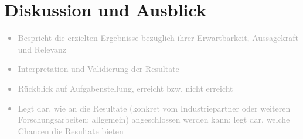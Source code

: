 \chapter{Diskussion und Ausblick}
\label{sec:DiskussionUndAusblick}

\textcolor{darkgray}{
  \begin{itemize}
  \item Bespricht die erzielten Ergebnisse bezüglich ihrer Erwartbarkeit, Aussagekraft und Relevanz
  \item Interpretation und Validierung der Resultate
  \item Rückblick auf Aufgabenstellung, erreicht bzw. nicht erreicht
  \item Legt dar, wie an die Resultate (konkret vom Industriepartner oder weiteren Forschungsarbeiten; allgemein) angeschlossen werden kann; legt dar, welche Chancen die Resultate bieten
  \end{itemize}
}